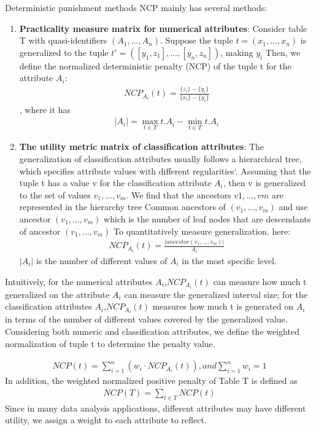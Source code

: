 \documentclass[journal,transmag]{IEEEtran}
\begin{document}
Deterministic punishment methods NCP mainly has several methods:
\begin{enumerate}
	\item{\bf Practicality measure matrix for numerical attributes}: Consider table T with quasi-identifiers $ (A_1, ..., A_n) $. Suppose the tuple $ t = (x_1, ..., x_n) $ is generalized to the tuple $ t '= ([y_1, z_1], ..., [y_n, z_n]) $, making $ y_i $ Then, we define the normalized deterministic penalty (NCP) of the tuple t for the attribute $ A_i $:
	\begin{eqnarray}\label{equ:ncpai}
	NCP_{A_i}(t)= \frac{\{z_i\}-\{y_i\}}{\{x_i\}-\{y_i\}}
	\end{eqnarray}
	, where it has
	\begin{eqnarray}\label{equ:ncpai2}
		|A_i| = \max_{t \in T} t.A_i - \min_{t \in T} t.A_i 
	\end{eqnarray}


	\item{\bf The utility metric matrix of classification attributes}: The generalization of classification attributes usually follows a hierarchical tree, which specifies attribute values with different regularities‘. 
	Assuming that the tuple t has a value v for the classification attribute $ A_i $, then v is generalized to the set of values $v_1,...,v_m$. We find that the ancestors $v1,\dots,vm$ are represented in the hierarchy tree Common ancestors of $(v_1,...,v_m)$ and use ancestor $(v_1,...,v_m)$ which is the number of leaf nodes that are descendants of ancestor $(v_1,...,v_m)$ To quantitatively measure generalization. here:
	\begin{eqnarray}\label{equ:ncpat}
	NCP_{A_i}(t)= \frac{|ancestor(v_1,\dots,v_m)|}{A_i} 
	\end{eqnarray}
	$|A_i|$ is the number of different values of $ A_i $ in the most specific level.
\end{enumerate}

Intuitively, for the numerical attributes $ A_i $,$ NCP_{A_i} (t) $ can measure how much t generalized on the attribute $ A_i $ can measure the generalized interval size; for the classification attributes $ A_i $,$ NCP_{ A_i} (t) $ measures how much t is generated on $ A_i $ in terms of the number of different values covered by the generalized value. Considering both numeric and classification attributes, we define the weighted normalization of tuple t to determine the penalty value.

\begin{eqnarray}\label{equ:tlpat}
NCP(t)= \sum^{n}_{i=1}(w_i\cdot NCP_{A_i}(t)), and  \sum^{n}_{i=1} w_i = 1
\end{eqnarray}
In addition, the weighted normalized positive penalty of Table T is defined as
\begin{eqnarray}\label{equ:ncptl}
NCP(T) = \sum_{t \in T} NCP(t)
\end{eqnarray}
Since in many data analysis applications, different attributes may have different utility, we assign a weight to each attribute to reflect. 
\end{document}
